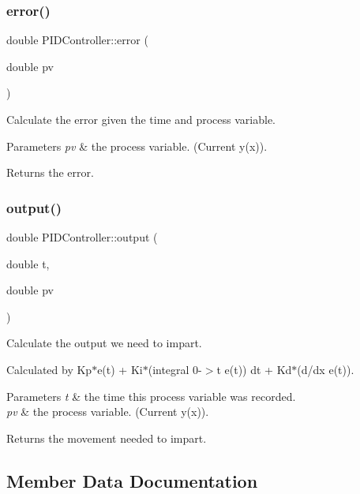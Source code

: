 \subsubsection{\texorpdfstring{error()}{error()}}
{\footnotesize\ttfamily double P\+I\+D\+Controller\+::error (\begin{DoxyParamCaption}\item[{double}]{pv }\end{DoxyParamCaption})}



Calculate the error given the time and process variable. 


\begin{DoxyParams}{Parameters}
{\em pv} & the process variable. (Current y(x)). \\
\hline
\end{DoxyParams}
\begin{DoxyReturn}{Returns}
the error. 
\end{DoxyReturn}
\mbox{\label{class_p_i_d_controller_ad8d86f165bb52832ad0ea74d2c6914cc}} 
\subsubsection{\texorpdfstring{output()}{output()}}
{\footnotesize\ttfamily double P\+I\+D\+Controller\+::output (\begin{DoxyParamCaption}\item[{double}]{t,  }\item[{double}]{pv }\end{DoxyParamCaption})}



Calculate the output we need to impart. 

Calculated by Kp$\ast$e(t) + Ki$\ast$(integral 0-\/$>$t e(t)) dt + Kd$\ast$(d/dx e(t)). 
\begin{DoxyParams}{Parameters}
{\em t} & the time this process variable was recorded. \\
\hline
{\em pv} & the process variable. (Current y(x)). \\
\hline
\end{DoxyParams}
\begin{DoxyReturn}{Returns}
the movement needed to impart. 
\end{DoxyReturn}


\subsection{Member Data Documentation}
\mbox{\label{class_p_i_d_controller_aaf31f0adb542cb3bae0940dfd05b6640}} 
